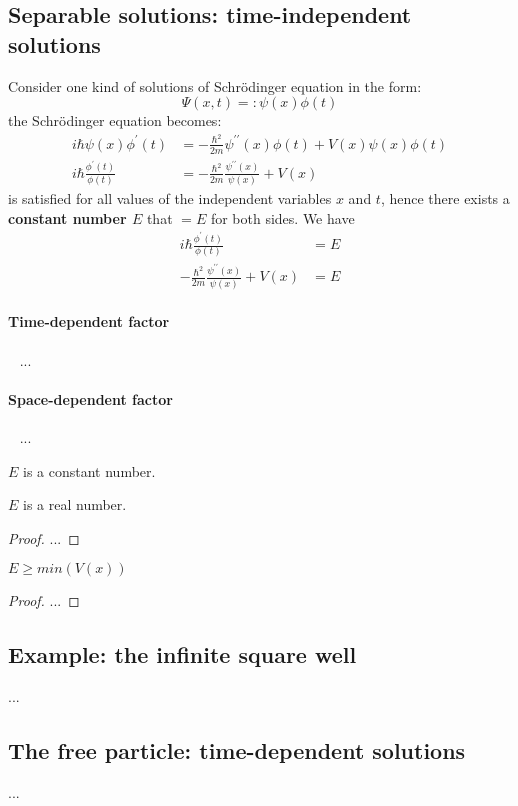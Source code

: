 \subsection{Separable solutions: time-independent solutions}
Consider one kind of solutions of Schrödinger equation in the form:
$$
    \Psi(x, t)=: \psi(x) \phi(t)
$$
the Schrödinger equation becomes:
\begin{align}
    i \hbar \psi(x) \phi^{\prime}(t)         & =-\frac{\hbar^{2}}{2 m} \psi^{\prime \prime}(x) \phi(t)+V(x) \psi(x) \phi(t)    \\
    i \hbar \frac{\phi^{\prime}(t)}{\phi(t)} & =-\frac{\hbar^{2}}{2 m} \frac{\psi^{\prime \prime}(x)}{\psi(x)}+V(x)\label{eq7}
\end{align}
 is satisfied for all values of the independent variables $x$ and $t$, hence there exists a \textbf{constant number $E$} that  $=E$ for both sides. We have
\begin{align}
    i \hbar \frac{\phi^{\prime}(t)}{\phi(t)}                            & =E \label{eq8} \\
    -\frac{\hbar^{2}}{2 m} \frac{\psi^{\prime \prime}(x)}{\psi(x)}+V(x) & =E\label{eq9}
\end{align}
\paragraph{Time-dependent factor }~{}
...
\paragraph{Space-dependent factor }~{}
...

\begin{remark}
    $E$ is a constant number.
\end{remark}
\begin{remark}
    $E$ is a real number.
\end{remark}
\begin{proof}
    ...
\end{proof}
\begin{remark}
    $E \geq min(V(x))$
\end{remark}
\begin{proof}
    ...
\end{proof}
\subsection{Example: the infinite square well}
...

\subsection{The free particle: time-dependent solutions}
...